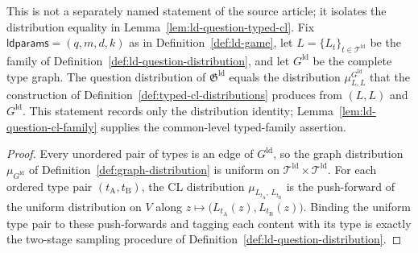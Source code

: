 \begin{lemma}\label{lem:ld-question-typed-equality}
	\leanok
	This is not a separately named statement of the source article; it isolates the distribution equality in Lemma~\ref{lem:ld-question-typed-cl}. Fix $\mathsf{ldparams} = (q,m,d,k)$ as in Definition~\ref{def:ld-game}, let $L = \{L_t\}_{t \in \mathcal T^{\mathrm{ld}}}$ be the family of Definition~\ref{def:ld-question-distribution}, and let $G^{\mathrm{ld}}$ be the complete type graph. The question distribution of $\mathfrak G^{\mathrm{ld}}$ equals the distribution $\mu^{G^{\mathrm{ld}}}_{L,L}$ that the construction of Definition~\ref{def:typed-cl-distributions} produces from $(L,L)$ and $G^{\mathrm{ld}}$. This statement records only the distribution identity; Lemma~\ref{lem:ld-question-cl-family} supplies the common-level typed-family assertion.
\end{lemma}
\begin{proof}
	\leanok
	Every unordered pair of types is an edge of $G^{\mathrm{ld}}$, so the graph distribution $\mu_{G^{\mathrm{ld}}}$ of Definition~\ref{def:graph-distribution} is uniform on $\mathcal T^{\mathrm{ld}} \times \mathcal T^{\mathrm{ld}}$. For each ordered type pair $(t_{\mathrm A}, t_{\mathrm B})$, the CL distribution $\mu_{L_{t_{\mathrm A}},\, L_{t_{\mathrm B}}}$ is the push-forward of the uniform distribution on $V$ along $z \mapsto \bigl(L_{t_{\mathrm A}}(z), L_{t_{\mathrm B}}(z)\bigr)$. Binding the uniform type pair to these push-forwards and tagging each content with its type is exactly the two-stage sampling procedure of Definition~\ref{def:ld-question-distribution}.
\end{proof}

